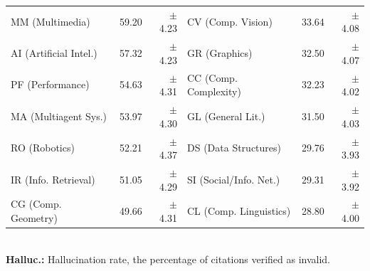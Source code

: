 \begin{table}[t]
\begin{tabular}{lrr@{\hskip 2em}lrr}
MM (Multimedia) & \cellcolor{red!24}59.20 & $\pm$4.23 & CV (Comp. Vision) & \cellcolor{red!14}33.64 & $\pm$4.08 \\
AI (Artificial Intel.) & \cellcolor{red!22}57.32 & $\pm$4.23 & GR (Graphics) & \cellcolor{red!14}32.50 & $\pm$4.07 \\
PF (Performance) & \cellcolor{red!22}54.63 & $\pm$4.31 & CC (Comp. Complexity) & \cellcolor{red!14}32.23 & $\pm$4.02 \\
MA (Multiagent Sys.) & \cellcolor{red!22}53.97 & $\pm$4.30 & GL (General Lit.) & \cellcolor{red!12}31.50 & $\pm$4.03 \\
RO (Robotics) & \cellcolor{red!22}52.21 & $\pm$4.37 & DS (Data Structures) & \cellcolor{red!12}29.76 & $\pm$3.93 \\
IR (Info. Retrieval) & \cellcolor{red!20}51.05 & $\pm$4.29 & SI (Social/Info. Net.) & \cellcolor{red!12}29.31 & $\pm$3.92 \\
CG (Comp. Geometry) & \cellcolor{red!20}49.66 & $\pm$4.31 & CL (Comp. Linguistics) & \cellcolor{red!12}28.80 & $\pm$4.00 \\
\bottomrule
\end{tabular}\\[0.5em]
\footnotesize\colorbox{red!15}{\textbf{Halluc.:}} Hallucination rate, the percentage of citations verified as invalid.
\end{table}

